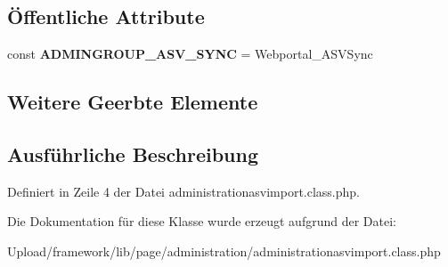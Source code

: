 \subsection*{Öffentliche Attribute}
\begin{DoxyCompactItemize}
\item 
\mbox{\label{classadministrationasvimport_aba11c069340c0a082018e41786b9f4df}} 
const {\bfseries A\+D\+M\+I\+N\+G\+R\+O\+U\+P\+\_\+\+A\+S\+V\+\_\+\+S\+Y\+NC} = \textquotesingle{}Webportal\+\_\+\+A\+S\+V\+Sync\textquotesingle{}
\end{DoxyCompactItemize}
\subsection*{Weitere Geerbte Elemente}


\subsection{Ausführliche Beschreibung}


Definiert in Zeile 4 der Datei administrationasvimport.\+class.\+php.



Die Dokumentation für diese Klasse wurde erzeugt aufgrund der Datei\+:\begin{DoxyCompactItemize}
\item 
Upload/framework/lib/page/administration/administrationasvimport.\+class.\+php\end{DoxyCompactItemize}
